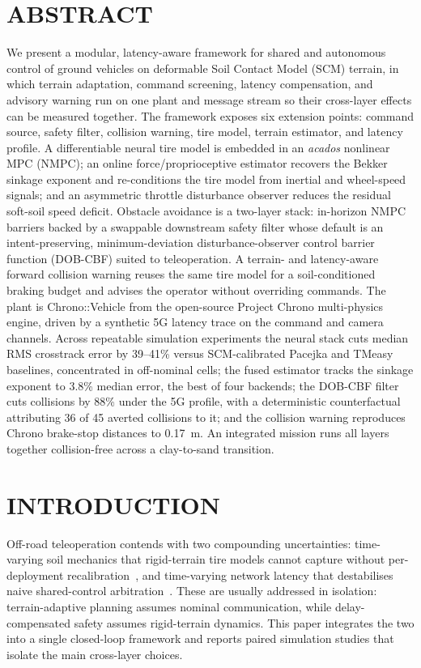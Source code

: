 \documentclass{acmd2026_fullpaper}
\begin{document}
\section*{ABSTRACT}
We present a modular, latency-aware framework for shared and autonomous control
of ground vehicles on deformable Soil Contact Model (SCM) terrain, in which
terrain adaptation, command screening, latency compensation, and advisory
warning run on one plant and message stream so their cross-layer effects can be
measured together. The framework exposes six extension points: command source,
safety filter, collision warning, tire model, terrain estimator, and latency
profile. A differentiable neural tire model is embedded in an \emph{acados}
nonlinear MPC (NMPC); an online force/proprioceptive estimator recovers the
Bekker sinkage exponent and re-conditions the tire model from inertial and
wheel-speed signals; and an asymmetric throttle disturbance observer reduces the
residual soft-soil speed deficit. Obstacle avoidance is a two-layer stack:
in-horizon NMPC barriers backed by a swappable downstream safety filter whose
default is an intent-preserving, minimum-deviation disturbance-observer control
barrier function (DOB-CBF) suited to teleoperation. A terrain- and latency-aware
forward collision warning reuses the same tire model for a soil-conditioned
braking budget and advises the operator without overriding commands. The plant
is Chrono::Vehicle from the open-source Project Chrono multi-physics engine,
driven by a synthetic 5G latency trace on the command and camera channels. Across repeatable simulation experiments the
neural stack cuts median RMS crosstrack error by 39--41\% versus SCM-calibrated
Pacejka and TMeasy baselines, concentrated in off-nominal cells; the fused
estimator tracks the sinkage exponent to 3.8\% median error, the best of four
backends; the DOB-CBF filter cuts collisions by 88\% under the 5G profile, with
a deterministic counterfactual attributing 36 of 45 averted collisions to it;
and the collision warning reproduces Chrono brake-stop distances to 0.17~m. An
integrated mission runs all layers together collision-free across a
clay-to-sand transition.

\section{INTRODUCTION}
Off-road teleoperation contends with two compounding uncertainties: time-varying
soil mechanics that rigid-terrain tire models cannot capture without
per-deployment recalibration~\cite{Dallas21,Bekker69}, and time-varying network
latency that destabilises naive shared-control arbitration~\cite{Choi23,Zhang25}.
These are usually addressed in isolation: terrain-adaptive planning assumes
nominal communication, while delay-compensated safety assumes rigid-terrain
dynamics. This paper integrates the two into a single closed-loop framework and
reports paired simulation studies that isolate the main cross-layer choices.
\end{document}
